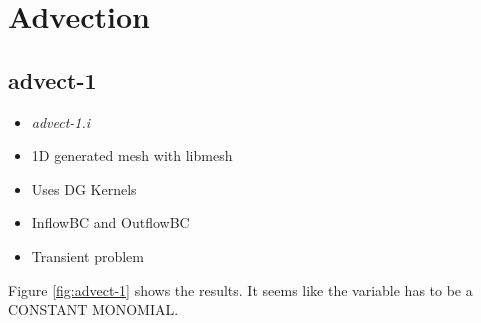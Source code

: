 \documentclass[11pt,letterpaper]{article}
\begin{document}
\section{Advection}

	\subsection{advect-1}

	\begin{itemize}
		\item \textit{advect-1.i}
		\item 1D generated mesh with libmesh
		\item Uses DG Kernels
		\item InflowBC and OutflowBC
		\item Transient problem
	\end{itemize}

    Figure \ref{fig:advect-1} shows the results.
    It seems like the variable has to be a CONSTANT MONOMIAL.
\end{document}
